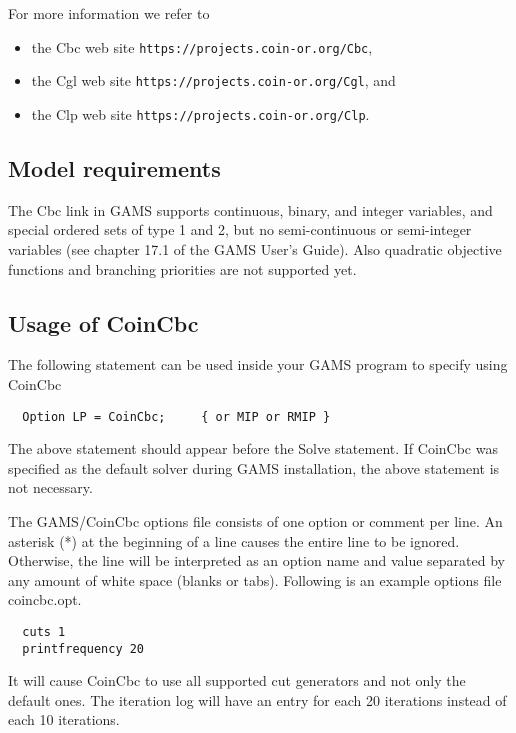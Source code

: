 For more information we refer to
\begin{itemize}
\item the Cbc web site \texttt{https://projects.coin-or.org/Cbc},
\item the Cgl web site \texttt{https://projects.coin-or.org/Cgl}, and
\item the Clp web site \texttt{https://projects.coin-or.org/Clp}.
\end{itemize}

\subsection{Model requirements}

The Cbc link in GAMS supports continuous, binary, and integer variables, and special ordered sets of type 1 and 2, but no semi-continuous or semi-integer variables (see chapter 17.1 of the GAMS User's Guide).
Also quadratic objective functions and branching priorities are not supported yet.

\subsection{Usage of CoinCbc}

The following statement can be used inside your GAMS program to specify using CoinCbc
\begin{verbatim}
  Option LP = CoinCbc;     { or MIP or RMIP }
\end{verbatim}

The above statement should appear before the Solve statement.
If CoinCbc was specified as the default solver during GAMS installation, the above statement is not necessary.

The GAMS/CoinCbc options file consists of one option or comment per line.
An asterisk (*) at the beginning of a line causes the entire line to be ignored.
Otherwise, the line will be interpreted as an option name and value separated by any amount of white space (blanks or tabs).
Following is an example options file coincbc.opt.
\begin{verbatim}
  cuts 1
  printfrequency 20
\end{verbatim}
It will cause CoinCbc to use all supported cut generators and not only the default ones.
The iteration log will have an entry for each 20 iterations instead of each 10 iterations.


